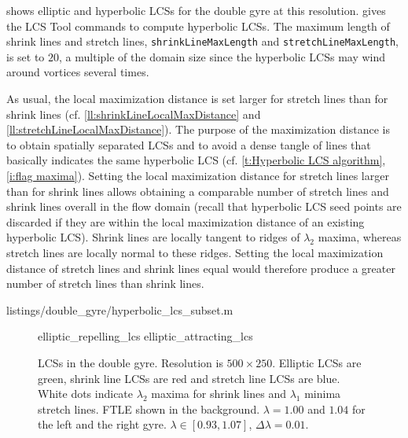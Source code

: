 \documentclass{article}
\newlength\figurewidth
\begin{document}
 shows elliptic and hyperbolic LCSs for the double gyre at this resolution.
 gives the LCS Tool commands to compute hyperbolic LCSs.
The maximum length of shrink lines and stretch lines, \lstinline!shrinkLineMaxLength! and \lstinline!stretchLineMaxLength!, is set to $20$, a multiple of the domain size since the hyperbolic LCSs may wind around vortices several times.

As usual, the local maximization distance is set larger for stretch lines than for shrink lines (cf. \cref{ll:shrinkLineLocalMaxDistance} and \cref{ll:stretchLineLocalMaxDistance}).
The purpose of the maximization distance is to obtain spatially separated LCSs and to avoid a dense tangle of lines that basically indicates the same hyperbolic LCS (cf. \cref{t:Hyperbolic LCS algorithm}, \cref{i:flag maxima}).
Setting the local maximization distance for stretch lines larger than for shrink lines allows obtaining a comparable number of stretch lines and shrink lines overall in the flow domain (recall that hyperbolic LCS seed points are discarded if they are within the local maximization distance of an existing hyperbolic LCS).
Shrink lines are locally tangent to ridges of $\lambda_2$ maxima, whereas stretch lines are locally normal to these ridges.
Setting the local maximization distance of stretch lines and shrink lines equal would therefore produce a greater number of stretch lines than shrink lines.


{listings/double_gyre/hyperbolic_lcs_subset.m}

\begin{figure}
\centering
\setlength{}
{elliptic_repelling_lcs}
{elliptic_attracting_lcs}
\caption{
LCSs in the double gyre.
Resolution is $500 \times 250$.
Elliptic LCSs are green, shrink line LCSs are red and stretch line LCSs are blue.
White dots indicate $\lambda_2$ maxima for shrink lines and $\lambda_1$ minima stretch lines.
FTLE shown in the background.
$\lambda = 1.00$ and $1.04$ for the left and the right gyre.
$\lambda \in [0.93,1.07]$, $\Delta\lambda = 0.01$.
}
\label{f:double gyre lambda hyperbolic LCS}
\end{figure}
\end{document}
